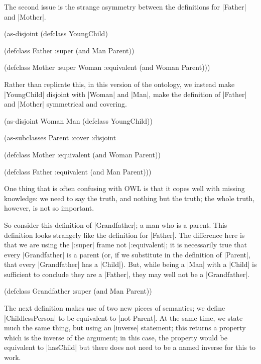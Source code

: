 The second issue is the strange asymmetry between the definitions for
|Father| and |Mother|.

\begin{tawnyexample}
(as-disjoint
 (defclass YoungChild)

 (defclass Father :super
   (and Man Parent))

 (defclass Mother
   :super Woman
   :equivalent (and Woman Parent)))
\end{tawnyexample}

Rather than replicate this, in this version of the ontology, we
instead make |YoungChild| disjoint with |Woman| and |Man|, make the
definition of |Father| and |Mother| symmetrical and covering.

\begin{tawny}
(as-disjoint
 Woman Man
 (defclass YoungChild))

(as-subclasses
 Parent
 :cover :disjoint

 (defclass Mother
   :equivalent (and Woman Parent))

 (defclass Father
   :equivalent (and Man Parent)))
\end{tawny}

One thing that is often confusing with OWL is that it copes well with
missing knowledge: we need to say the truth, and nothing but the
truth; the whole truth, however, is not so important.

So consider this definition of |Grandfather|; a man who is a
parent. This definition looks strangely like the definition for
|Father|. The difference here is that we are using the |:super| frame
not |:equivalent|; it is necessarily true that every |Grandfather| is
a parent (or, if we substitute in the definition of |Parent|, that
every |Grandfather| has a |Child|). But, while being a |Man| with a
|Child| is sufficient to conclude they are a |Father|, they may well
not be a |Grandfather|.

\begin{tawny}
(defclass Grandfather
  :super (and Man Parent))
\end{tawny}

The next definition makes use of two new pieces of semantics; we
define |ChildlessPerson| to be equivalent to |not Parent|. At the same
time, we state much the same thing, but using an |inverse| statement;
this returns a property which is the inverse of the argument; in this
case, the property would be equivalent to |hasChild| but there does
not need to be a named inverse for this to work. 

